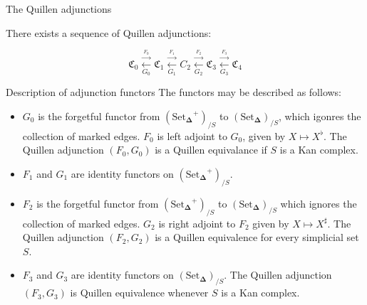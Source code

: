 \documentclass{beamer}[9pt]
\newcommand{\8}{\ensuremath{\infty}}
\newcommand{\C}{\ensuremath{\mathfrak{C}}}
\newcommand{\SSet}{\ensuremath{\text{Set}_{\boldsymbol{\Delta}}}}
\newcommand{\adj}[2]{\ensuremath{\overset{\overset{#1}{ \rightarrow}}{\underset{#2}{\leftarrow}}}}
\begin{document}
\begin{frame}{The Quillen adjunctions}
  \begin{theorem}
    There exists a sequence of Quillen adjunctions:

    $$
      \C_0 \adj{F_0}{G_0} \C_1 \adj{F_1}{G_1} C_2 \adj{F_2}{G_2} \C_3 \adj{F_3}{G_3} \C_4
    $$
  \end{theorem}
\end{frame}

\begin{frame}{Description of adjunction functors}
  The functors may be described as follows:
  \begin{itemize}
    \item<1->[(A0)] $G_0$ is the forgetful functor from $(\SSet^+)_{/S}$ to $(\SSet)_{/S}$, which igonres the collection of marked edges. $F_0$ is left adjoint to $G_0$, given by $X \mapsto X^\flat$. The Quillen adjunction $(F_0, G_0)$ is a Quillen equivalance if $S$ is a Kan complex.
    \item<2->[(A1)] $F_1$ and $G_1$ are identity functors on $(\SSet^+)_{/S}$.
    \item<3->[(A2)]  $F_2$ is the forgetful functor from $(\SSet^+)_{/S}$ to $(\SSet)_{/S}$ which ignores the collection of marked edges. $G_2$ is right adjoint to $F_2$ given by $X \mapsto X^\sharp$. The Quillen adjunction $(F_2, G_2)$ is a Quillen equivalence for every simplicial set $S$.
    \item<4>[(A3)]  $F_3$ and $G_3$ are identity functors on $(\SSet)_{/S}$. The Quillen adjunction $(F_3, G_3)$ is Quillen equivalence whenever $S$ is a Kan complex.
  \end{itemize}
\end{frame}
\end{document}
